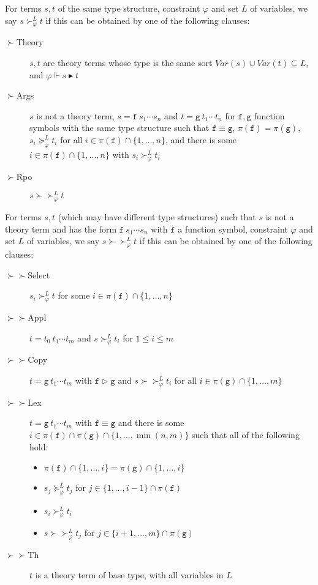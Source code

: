 \documentclass[a4paper,USenglish,cleveref,autoref,thm-restate]{lipics-v2021}
\newcommand{\Var}{\mathit{Var}}
\newcommand{\gtvA}{L}
\newcommand{\geqth}{\succeq_\varphi^\gtvA}
\newcommand{\grth}{\succ_\varphi^\gtvA}
\newcommand{\rpoth}{\succ\!\!\!\succ_\varphi^\gtvA}
\newcommand{\rpo}{\succ\!\!\!\succ}
\newcommand{\grpred}{\rhd}
\newcommand{\eqpred}{\equiv}
\newcommand{\grsort}{\blacktriangleright}
\newcommand{\symb}[1]{\mathtt{#1}}
\newcommand{\afun}{\symb{f}}
\newcommand{\bfun}{\symb{g}}
\newcommand{\filter}{\pi}
\begin{document}
For terms $s,t$ of the same type structure, constraint $\varphi$ and set $\gtvA$ of variables, we
say $s \grth t$ if this can be obtained by one of the following clauses:
\begin{description}
\item[$\succ$Theory] $s,t$ are theory terms whose type is the same sort
  $\Var(s) \cup \Var(t) \subseteq \gtvA$,
  and $\varphi \Vdash s \grsort t$
\item[$\succ$Args] $s$ is not a theory term,
  $s = \afun\ s_1 \cdots s_n$ and $t = \bfun\ t_1 \cdots t_n$ for $\afun,\bfun$
  function symbols with the same type structure such that $\afun \eqpred \bfun$,
  $\filter(\afun) = \filter(\bfun)$, $s_i \geqth t_i$ for all $i \in \filter(\afun) \cap
  \{1,\dots,n\}$, and there is some $i \in \filter(\afun) \cap \{1,\dots,n\}$ with
  $s_i \grth t_i$
\item[$\succ$Rpo] $s \rpoth t$
\end{description}

For terms $s,t$ (which may have different type structures) such that $s$ is not a theory term and
has the form $\afun\ s_1 \cdots s_n$ with $\afun$ a function symbol, constraint $\varphi$ and set
$\gtvA$ of variables, we say $s \rpoth t$ if this can be obtained by one of the following clauses:
\begin{description}
\item[$\rpo$Select] $s_i \grth t$ for some $i \in \filter(\afun) \cap \{1,\dots,n\}$
\item[$\rpo$Appl] $t = t_0\ t_1 \cdots t_m$ and $s \grth t_i$ for $1 \leq i \leq m$
\item[$\rpo$Copy] $t = \bfun\ t_1 \cdots t_m$ with $\afun \grpred \bfun$ and 
    $s \rpoth t_i$ for all $i \in \filter(\bfun) \cap \{1,\dots,m\}$
\item[$\rpo$Lex] $t = \bfun\ t_1 \cdots t_m$ with $\afun \eqpred \bfun$ and there is some
    $i \in \filter(\afun) \cap \filter(\bfun) \cap \{1,\dots,\min(n,m)\}$
    such that all of the following hold:
    \begin{itemize}
    \item $\filter(\afun) \cap \{1,\dots,i\} = \filter(\bfun) \cap \{1,\dots,i\}$
    \item $s_j \geqth t_j$ for $j \in \{1,\dots,i-1\} \cap \filter(\afun)$
    \item $s_i \grth t_i$
    \item $s \rpoth t_j$ for $j \in \{i+1,\dots,m\} \cap \filter(\bfun)$
    \end{itemize}
\item[$\rpo$Th] $t$ is a theory term of base type, with all variables in $\gtvA$
\end{description}
\end{document}
